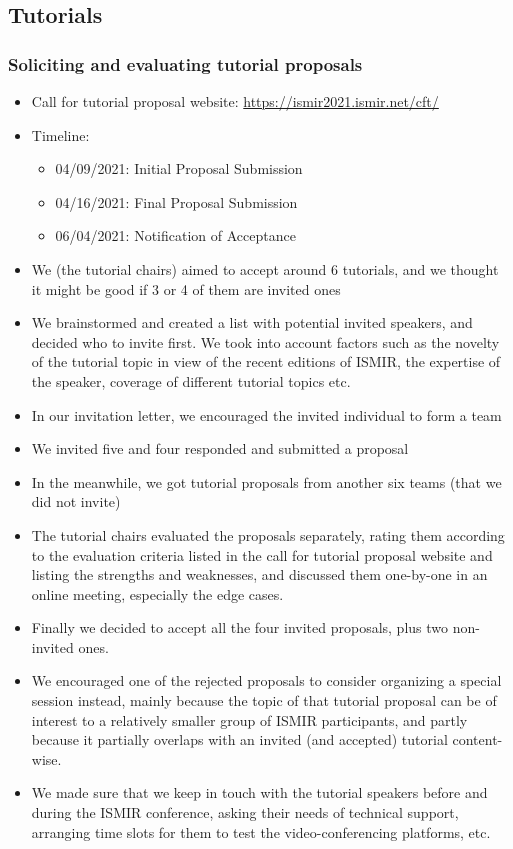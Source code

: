 \documentclass[%
10pt,								%
]
{scrartcl}
\begin{document}
    \subsection{Tutorials}
        \subsubsection{Soliciting and evaluating tutorial proposals}
            \begin{itemize}
                \item Call for tutorial proposal website: \href{https://ismir2021.ismir.net/cft/}{https://ismir2021.ismir.net/cft/}
                \item   Timeline:
                    \begin{itemize}
                        \item   04/09/2021: Initial Proposal Submission
                        \item   04/16/2021: Final Proposal Submission
                        \item   06/04/2021: Notification of Acceptance
                    \end{itemize}
                \item   We (the tutorial chairs) aimed to accept around 6 tutorials, and we thought it might be good if 3 or 4 of them are invited ones
                \item   We brainstormed and created a list with potential invited speakers, and decided who to invite first.  We took into account factors such as the novelty of the tutorial topic in view of the recent editions of ISMIR, the expertise of the speaker, coverage of different tutorial topics etc.
                \item   In our invitation letter, we encouraged the invited individual to form a team 
                \item   We invited five and four responded and submitted a proposal
                \item   In the meanwhile, we got tutorial proposals from another six teams (that we did not invite)
                \item   The tutorial chairs evaluated the proposals separately, rating them according to the evaluation criteria listed in the call for tutorial proposal website and listing the strengths and weaknesses, and discussed them one-by-one in an online meeting, especially the edge cases.
                \item   Finally we decided to accept all the four invited proposals, plus two non-invited ones.
                \item   We encouraged one of the rejected proposals to consider organizing a special session instead, mainly because the topic of that tutorial proposal can be of interest to a relatively smaller group of ISMIR participants, and partly because it partially overlaps with an invited (and accepted) tutorial content-wise.
                \item   We made sure that we keep in touch with the tutorial speakers before and during the ISMIR conference, asking their needs of technical support, arranging time slots for them to test the video-conferencing platforms, etc.


\end{itemize}
\end{document}
